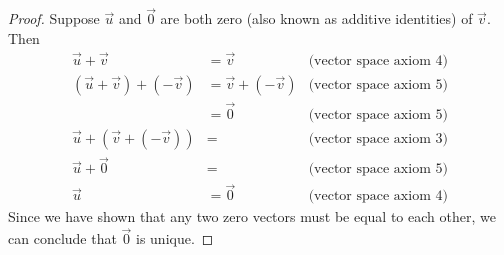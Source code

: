 \documentclass[12pt]{article}
\begin{document}
\begin{enumerate}
\begin{proof}
                      Suppose $\vec{u}$ and $\vec{0}$ are both zero (also known as additive identities) of $\vec{v}$. Then
                      \begin{align*}
                              \vec{u} + \vec{v}                & = \vec{v}             & \textrm{(vector space axiom 4)} \\
                              (\vec{u} + \vec{v}) + (-\vec{v}) & = \vec{v} +(-\vec{v}) & \textrm{(vector space axiom 5)} \\
                                                               & = \vec{0}             & \textrm{(vector space axiom 5)} \\
                              \vec{u} + (\vec{v} + (-\vec{v})) & =                     & \textrm{(vector space axiom 3)} \\
                              \vec{u} + \vec{0}                & =                     & \textrm{(vector space axiom 5)} \\
                              \vec{u}                          & = \vec{0}             & \textrm{(vector space axiom 4)}
                      \end{align*}
                      Since we have shown that any two zero vectors must be equal to each other,
                      we can conclude that $\vec{0}$ is unique.
              \end{proof}
\end{enumerate}
\end{document}
